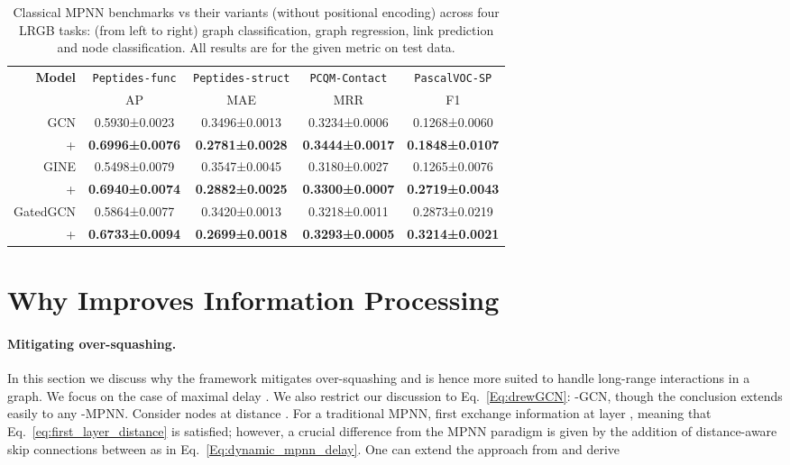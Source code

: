 \documentclass{article}
\theoremstyle{plain}
\theoremstyle{definition}
\theoremstyle{remark}
\begin{document}
\begin{table*}[ht]
\centering
\caption{\label{tab:mpnn_vs_drew_all_lrgb}Classical MPNN benchmarks vs their  variants (without positional encoding) across four LRGB tasks: (from left to right) graph classification, graph regression, link prediction and node classification. All results are for the given metric on test data.}
\begin{tabular}{@{}rcccc@{}}
\toprule
\multirow{2}{*}{\textbf{Model}} & \texttt{Peptides-func} & \texttt{Peptides-struct} & \texttt{PCQM-Contact}  & \texttt{PascalVOC-SP}  \\
                                & AP           & MAE          & MRR          & F1           \\ \midrule
GCN                             & 0.5930\small±0.0023          & 0.3496\small±0.0013            & 0.3234\small±0.0006          & 0.1268\small±0.0060          \\
+                           & \textbf{0.6996\small±0.0076} & \textbf{0.2781\small±0.0028}   & \textbf{0.3444\small±0.0017} & \textbf{0.1848\small±0.0107} \\ \midrule
GINE                            & 0.5498\small±0.0079          & 0.3547\small±0.0045            & 0.3180\small±0.0027          & 0.1265\small±0.0076          \\
+                           & \textbf{0.6940\small±0.0074} & \textbf{0.2882\small±0.0025}   & \textbf{0.3300\small±0.0007} & \textbf{0.2719\small±0.0043} \\ \midrule
GatedGCN                        & 0.5864\small±0.0077          & 0.3420\small±0.0013            & 0.3218\small±0.0011          & 0.2873\small±0.0219          \\
+                           & \textbf{0.6733\small±0.0094} & \textbf{0.2699\small±0.0018}   & \textbf{0.3293\small±0.0005} & \textbf{0.3214\small±0.0021} \\ \bottomrule
\end{tabular}
\end{table*}

\section{Why  Improves Information Processing}
\label{sec:theory}
\paragraph{Mitigating over-squashing.} In this section we discuss why the  framework mitigates over-squashing and is hence more suited to handle long-range interactions in a graph. We focus on the case of maximal delay . We also restrict our discussion to Eq.~\eqref{Eq:drewGCN}: -GCN, though the conclusion extends easily to any -MPNN. Consider nodes  at distance . For a traditional MPNN,  first exchange information at layer , meaning that Eq.~\eqref{eq:first_layer_distance} is satisfied; however, a crucial difference from the MPNN paradigm is given by the addition of distance-aware skip connections between  as in Eq.~\eqref{Eq:dynamic_mpnn_delay}. One can extend the approach from \citet{topping2021understanding} and derive
\end{document}
